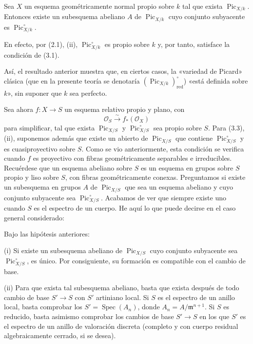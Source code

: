  Sea $X$ un esquema geométricamente normal propio sobre $k$ tal que
exista $\operatorname{Pic}_{X/k}$. Entonces existe un subesquema abeliano $A$
de $\operatorname{Pic}_{X/k}$ cuyo conjunto subyacente es
$\operatorname{Pic}_{X/k}^\circ$.

En efecto, por (2.1), (ii), $\operatorname{Pic}_{X/k}^\circ$ es propio sobre
$k$ y, por tanto, satisface la condición de (3.1).

Así, el resultado anterior muestra que, en ciertos casos, la «variedad de
Picard» clásica (que en la presente teoría se denotaría
$(\operatorname{Pic}_{X/k})_{\mathrm{red}}^\circ$) «está definida sobre $k$»,
sin suponer que $k$ sea perfecto.

Sea ahora $f:X\longrightarrow S$ un esquema relativo propio y plano, con
\[
\mathcal O_S\xrightarrow{\sim}f_*(\mathcal O_X)
\]
para simplificar, tal que exista $\operatorname{Pic}_{X/S}$ y
$\operatorname{Pic}_{X/S}^\circ$ sea propio sobre $S$. Para (3.3), (ii),
suponemos además que existe un abierto de $\operatorname{Pic}_{X/S}$ que
contiene $\operatorname{Pic}_{X/S}^\circ$ y es cuasiproyectivo sobre $S$. Como
se vio anteriormente, esta condición se verifica cuando $f$ es proyectivo con
fibras geométricamente separables e irreducibles. Recuérdese que un esquema
abeliano sobre $S$ es un esquema en grupos sobre $S$ propio y liso sobre $S$,
con fibras geométricamente conexas. Preguntamos si existe un subesquema en
grupos $A$ de $\operatorname{Pic}_{X/S}$ que sea un esquema abeliano y cuyo
conjunto subyacente sea $\operatorname{Pic}_{X/S}^\circ$. Acabamos de ver que
siempre existe uno cuando $S$ es el espectro de un cuerpo. He aquí lo que puede
decirse en el caso general considerado:

 Bajo las hipótesis anteriores:

\noindent(i) Si existe un subesquema abeliano de
$\operatorname{Pic}_{X/S}$ cuyo conjunto subyacente sea
$\operatorname{Pic}_{X/S}^\circ$, es único. Por consiguiente, su formación es
compatible con el cambio de base.

\noindent(ii) Para que exista tal subesquema abeliano, basta que exista después
de todo cambio de base $S'\longrightarrow S$ con $S'$ artiniano local. Si $S$
es el espectro de un anillo local, basta comprobar los
$S'=\operatorname{Spec}(A_n)$, donde $A_n=A/\mathfrak m^{n+1}$. Si $S$ es
reducido, basta asimismo comprobar los cambios de base
$S'\longrightarrow S$ en los que $S'$ es el espectro de un anillo de
valoración discreta (completo y con cuerpo residual algebraicamente cerrado,
si se desea).

